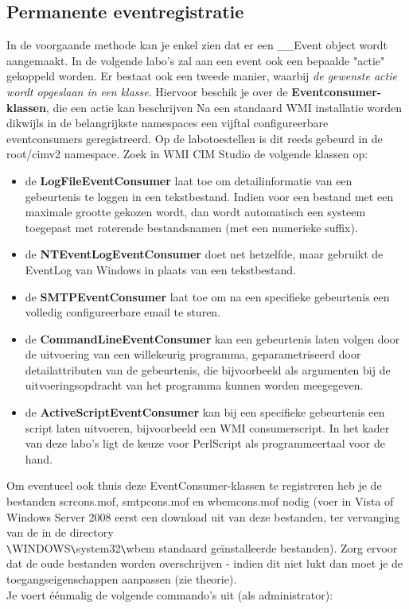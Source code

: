 \documentclass[11pt,a4paper]{report}
\begin{document}
\subsection{Permanente eventregistratie}
In de voorgaande methode kan je enkel zien dat er een \_\_Event object wordt aangemaakt. In de volgende labo's zal aan een event ook een bepaalde "actie" gekoppeld worden. Er bestaat ook een tweede manier, waarbij \textit{de gewenste actie wordt opgeslaan in een klasse}. Hiervoor beschik je over de \textbf{Eventconsumer-klassen}, die een actie kan beschrijven
Na een standaard WMI installatie worden dikwijls in de belangrijkste namespaces een vijftal configureerbare eventconsumers geregistreerd. Op de labotoestellen is dit reeds gebeurd in de root/cimv2 namespace. Zoek in WMI CIM Studio de volgende klassen op:
\begin{itemize}
\item de \textbf{LogFileEventConsumer} laat toe om detailinformatie van een gebeurtenis te loggen in een tekstbestand. Indien voor een bestand met een maximale grootte gekozen wordt, dan wordt automatisch een systeem toegepast met roterende bestandsnamen (met een numerieke suffix).
\item de \textbf{NTEventLogEventConsumer} doet net hetzelfde, maar gebruikt de EventLog van Windows in plaats van een tekstbestand.
\item de \textbf{SMTPEventConsumer} laat toe om na een specifieke gebeurtenis een volledig configureerbare email te sturen.
\item de \textbf{CommandLineEventConsumer} kan een gebeurtenis laten volgen door de uitvoering van een willekeurig programma, geparametriseerd door detailattributen van de gebeurtenis, die bijvoorbeeld als argumenten bij de uitvoeringsopdracht van het programma kunnen worden meegegeven.
\item de \textbf{ActiveScriptEventConsumer} kan bij een specifieke gebeurtenis een script laten uitvoeren, bijvoorbeeld een WMI consumerscript. In het kader van deze labo's ligt de keuze voor PerlScript als programmeertaal voor de hand.
\end{itemize}
Om eventueel ook thuis deze EventConsumer-klassen te registreren heb je de bestanden scrcons.mof, smtpcons.mof en wbemcons.mof nodig (voer in Vista of Windows Server 2008 eerst een download uit van deze bestanden, ter vervanging van de in de directory\\ \verb+\+WINDOWS\verb+\+system32\verb+\+wbem standaard geïnstalleerde bestanden). Zorg ervoor dat de oude bestanden worden overschrijven - indien dit niet lukt dan moet je de toegangseigenschappen aanpassen (zie theorie). \\Je voert éénmalig de volgende commando's uit (als administrator):
\end{document}
